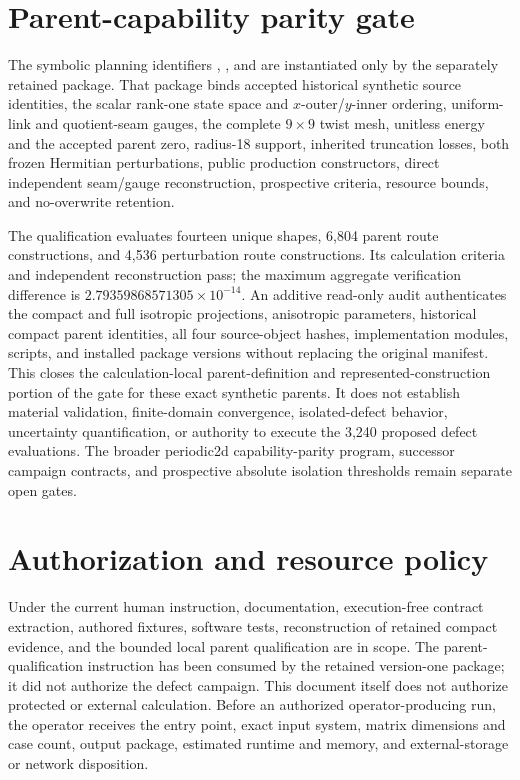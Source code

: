 \documentclass[11pt]{article}
\begin{document}
\section{Parent-capability parity gate}

The symbolic planning identifiers
,
, and
 are instantiated only by the separately retained
 package.  That package binds accepted
historical synthetic source identities, the scalar rank-one state space and
$x$-outer/$y$-inner ordering, uniform-link and quotient-seam gauges, the complete
$9\times9$ twist mesh, unitless energy and the accepted parent zero, radius-18 support,
inherited truncation losses, both frozen Hermitian perturbations, public production
constructors, direct independent seam/gauge reconstruction, prospective criteria,
resource bounds, and no-overwrite retention.

The qualification evaluates fourteen unique shapes, 6,804 parent route constructions,
and 4,536 perturbation route constructions.  Its calculation criteria and independent
reconstruction pass; the maximum aggregate verification difference is
$2.79359868571305\times10^{-14}$.  An additive read-only audit authenticates the
compact and full isotropic projections, anisotropic parameters, historical compact
parent identities, all four source-object hashes, implementation modules, scripts, and
installed package versions without replacing the original manifest.  This closes the
calculation-local parent-definition
and represented-construction portion of the gate for these exact synthetic parents.
It does not establish material validation, finite-domain convergence, isolated-defect
behavior, uncertainty quantification, or authority to execute the 3,240 proposed defect
evaluations.  The broader periodic2d capability-parity program, successor campaign
contracts, and prospective absolute isolation thresholds remain separate open gates.

\section{Authorization and resource policy}

Under the current human instruction, documentation, execution-free contract extraction,
authored fixtures, software tests, reconstruction of retained compact evidence, and the
bounded local parent qualification are in scope.  The parent-qualification instruction
has been consumed by the retained version-one package; it did not authorize the defect
campaign.  This document itself does not authorize protected or external calculation.
Before an authorized operator-producing run, the operator receives the entry point,
exact input system, matrix dimensions and case count, output package, estimated runtime
and memory, and external-storage or network disposition.
\end{document}
